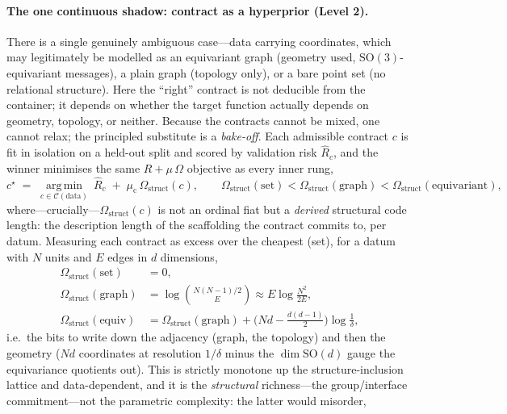 \documentclass[11pt]{article}
\theoremstyle{definition}
\begin{document}
\paragraph{The one continuous shadow: contract as a hyperprior (Level 2).} There is a single genuinely
ambiguous case---data carrying coordinates, which may legitimately be modelled as an equivariant graph
(geometry used, $\mathrm{SO}(3)$-equivariant messages), a plain graph (topology only), or a bare point
set (no relational structure). Here the ``right'' contract is not deducible from the container; it
depends on whether the target function actually depends on geometry, topology, or neither. Because the
contracts cannot be mixed, one cannot relax; the principled substitute is a \emph{bake-off}. Each
admissible contract $c$ is fit in isolation on a held-out split and scored by validation risk
$\widehat{R}_c$, and the winner minimises the same $R+\mu\,\Omega$ objective as every inner rung,
\begin{equation}
c^\star \;=\; \operatorname*{arg\,min}_{c\in\mathcal{C}(\text{data})}\ \widehat{R}_c
\;+\;\mu_{\mathrm c}\,\Omega_{\mathrm{struct}}(c),
\qquad
\Omega_{\mathrm{struct}}(\text{set})<\Omega_{\mathrm{struct}}(\text{graph})<\Omega_{\mathrm{struct}}(\text{equivariant}),
\label{eq:tiebreak}
\end{equation}
where---crucially---$\Omega_{\mathrm{struct}}(c)$ is not an ordinal fiat but a \emph{derived} structural
code length: the description length of the scaffolding the contract commits to, per datum. Measuring each
contract as excess over the cheapest (set), for a datum with $N$ units and $E$ edges in $d$ dimensions,
\begin{equation}
\begin{aligned}
\Omega_{\mathrm{struct}}(\text{set})&=0,\\
\Omega_{\mathrm{struct}}(\text{graph})&=\log\binom{N(N-1)/2}{E}\approx E\log\frac{N^2}{2E},\\
\Omega_{\mathrm{struct}}(\text{equiv})&=\Omega_{\mathrm{struct}}(\text{graph})+\big(Nd-\tfrac{d(d-1)}2\big)\log\tfrac1\delta,
\end{aligned}
\label{eq:omega-struct}
\end{equation}
i.e.\ the bits to write down the adjacency (graph, the topology) and then the geometry ($Nd$ coordinates
at resolution $1/\delta$ minus the $\dim\mathrm{SO}(d)$ gauge the equivariance quotients out). This is
strictly monotone up the structure-inclusion lattice and data-dependent, and it is the \emph{structural}
richness---the group/interface commitment---not the parametric complexity: the latter would misorder,
\end{document}
